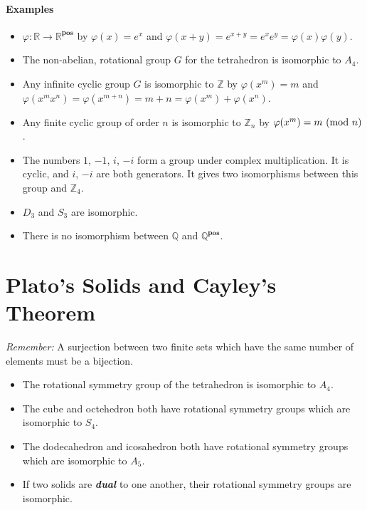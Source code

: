 \documentclass[a4paper,twocolumn,10pt]{article}
\begin{document}
  \paragraph{Examples}
  \begin{itemize}
    \item $\varphi\colon \mathbb{R} \rightarrow \mathbb{R}^{\textbf{pos}}$ by
      $\varphi{(x)} = e^x$ and $\varphi{(x+y)}=e^{x+y}=e^xe^y=\varphi{(x)}\varphi{(y)}$.
    \item The non-abelian, rotational group $G$ for the tetrahedron is isomorphic to $A_4$.
    \item Any infinite cyclic group $G$ is isomorphic to $\mathbb{Z}$ by
      $\varphi{(x^m)} = m$ and $\varphi{(x^mx^n)} =
      \varphi{(x^{m+n})}=m+n=\varphi{(x^m)}+\varphi{(x^n)}$.
    \item Any finite cyclic group of order $n$ is isomorphic to $\mathbb{Z}_n$
      by $\varphi{(x^m)} = m\ (\text{mod}\ n)$.
    \item The numbers $1$, $-1$, $i$, $-i$ form a group under complex
      multiplication. It is cyclic, and $i$, $-i$ are both generators. It gives
      two isomorphisms between this group and $\mathbb{Z}_4$.
    \item $D_3$ and $S_3$ are isomorphic.
    \item There is no isomorphism between $\mathbb{Q}$ and
      $\mathbb{Q}^{\textbf{pos}}$.
  \end{itemize}

  \section{Plato's Solids and Cayley's Theorem}
  \textit{Remember:} A surjection between two finite sets which have the same
  number of elements must be a bijection.

  \begin{itemize}
    \item The rotational symmetry group of the tetrahedron is isomorphic to
      $A_4$.

    \item The cube and octehedron both have rotational symmetry groups which
      are isomorphic to $S_4$.

    \item The dodecahedron and icosahedron both have rotational symmetry groups
      which are isomorphic to $A_5$.

    \item If two solids are \textbf{\textit{dual}} to one another, their
      rotational symmetry groups are isomorphic.
  \end{itemize}
\end{document}
